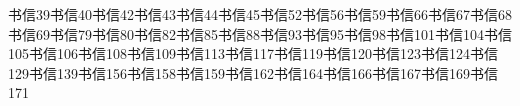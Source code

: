 书信39\newline{}书信40\newline{}书信42\newline{}书信43\newline{}书信44\newline{}书信45\newline{}书信52\newline{}书信56\newline{}书信59\newline{}书信66\newline{}书信67\newline{}书信68\newline{}书信69\newline{}书信79\newline{}书信80\newline{}书信82\newline{}书信85\newline{}书信88\newline{}书信93\newline{}书信95\newline{}书信98\newline{}书信101\newline{}书信104\newline{}书信105\newline{}书信106\newline{}书信108\newline{}书信109\newline{}书信113\newline{}书信117\newline{}书信119\newline{}书信120\newline{}书信123\newline{}书信124\newline{}书信129\newline{}书信139\newline{}书信156\newline{}书信158\newline{}书信159\newline{}书信162\newline{}书信164\newline{}书信166\newline{}书信167\newline{}书信169\newline{}书信171\par


